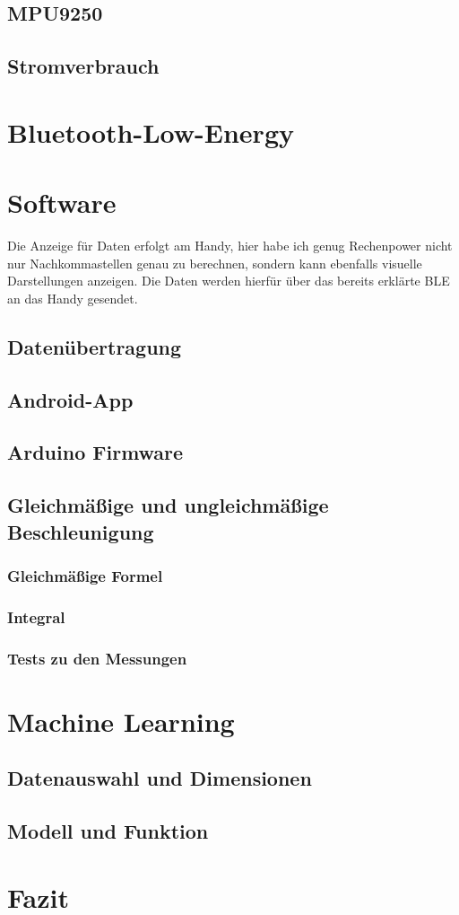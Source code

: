 \documentclass[12pt,titlepage]{scrreprt}
\begin{document}
\section{MPU9250}

\section{Stromverbrauch}


\chapter{Bluetooth-Low-Energy}


\chapter{Software}
Die Anzeige für Daten erfolgt am Handy, hier habe ich genug Rechenpower
nicht nur Nachkommastellen genau zu berechnen, sondern kann ebenfalls 
visuelle Darstellungen anzeigen. Die Daten werden hierfür über das bereits
erklärte BLE an das Handy gesendet.
\section{Datenübertragung}

\section{Android-App}

\section{Arduino Firmware}

\section{Gleichmäßige und ungleichmäßige Beschleunigung}

\subsection{Gleichmäßige Formel}

\subsection{Integral}

\subsection{Tests zu den Messungen}


\chapter{Machine Learning}
\section{Datenauswahl und Dimensionen}

\section{Modell und Funktion}


\chapter{Fazit}




\end{document}
